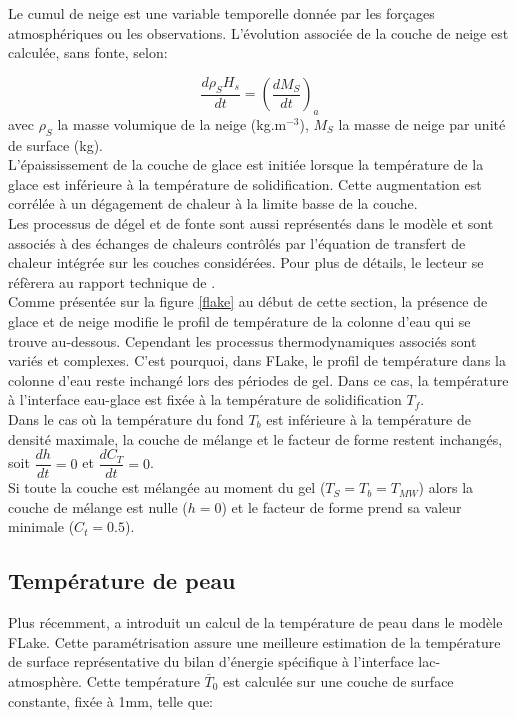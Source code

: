 \noindent Le cumul de neige est une variable temporelle donnée par les forçages atmosphériques ou les observations. L'évolution associée de la couche de neige est calculée, sans fonte, selon:

\begin{equation}
\dfrac{d\rho_{S}H_{s}}{dt} = \left(\dfrac{dM_{S}}{dt}\right)_{a}
\end{equation}
avec $\rho_{S}$ la masse volumique de la neige (kg.m$^{-3}$), $M_{S}$ la masse de neige par unité de surface (kg).\\

L'épaississement de la couche de glace est initiée lorsque la température de la glace est inférieure à la température de solidification. Cette augmentation est corrélée à un dégagement de chaleur à la limite basse de la couche.\\
Les processus de dégel et de fonte sont aussi représentés dans le modèle et sont associés à des échanges de chaleurs contrôlés par l'équation de transfert de chaleur intégrée sur les couches considérées. Pour plus de détails, le lecteur se réfèrera au rapport technique de \citet{mironov2008}.\\

Comme présentée sur la figure \ref{flake} au début de cette section, la présence de glace et de neige modifie le profil de température de la colonne d'eau qui se trouve au-dessous. Cependant les processus thermodynamiques associés sont variés et complexes. C'est pourquoi, dans FLake, le profil de température dans la colonne d'eau reste inchangé lors des périodes de gel. Dans ce cas, la température à l'interface eau-glace est fixée à la température de solidification $T_{f}$.\\
Dans le cas où la température du fond $T_{b}$ est inférieure à la température de densité maximale, la couche de mélange et le facteur de forme restent inchangés, soit $\dfrac{dh}{dt}=0$ et $\dfrac{dC_{T}}{dt}=0$.\\
Si toute la couche est mélangée au moment du gel ($T_{S}=T_{b}=T_{MW}$) alors la couche de mélange est nulle ($h=0$) et le facteur de forme prend sa valeur minimale ($C_{t}=0.5$).

\subsection{{\selectfont Température de peau}}

Plus récemment, \citet{lemoigne2016} a introduit un calcul de la température de peau dans le modèle FLake. Cette paramétrisation assure une meilleure estimation de la température de surface représentative du bilan d'énergie spécifique à l'interface lac-atmosphère. Cette température $\overline{T}_{0}$ est calculée sur une couche de surface constante, fixée à 1mm, telle que:

